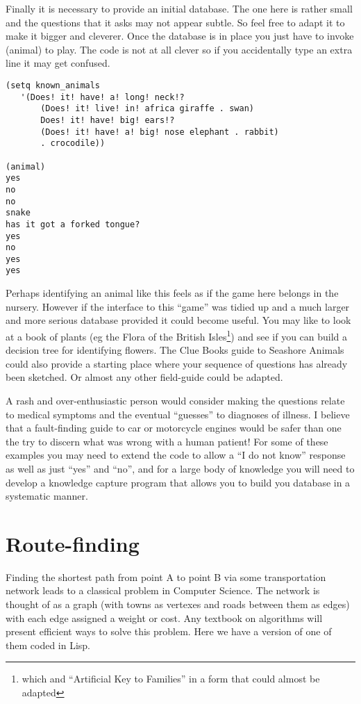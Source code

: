 Finally it is necessary to provide an initial database. The one
here is rather small and the questions that it asks may not appear subtle.
So feel free to adapt it to make it bigger and cleverer. Once the database
is in place you just have to invoke {\tx (animal)} to play. The code is
not at all clever so if you accidentally type an extra line it may get
confused.
{\small\begin{verbatim}
(setq known_animals
   '(Does! it! have! a! long! neck!?
       (Does! it! live! in! africa giraffe . swan)
       Does! it! have! big! ears!?
       (Does! it! have! a! big! nose elephant . rabbit)
       . crocodile))

(animal)
yes
no
no
snake
has it got a forked tongue?
yes
no
yes
yes
\end{verbatim}}

Perhaps identifying an animal like this feels as if the game here
belongs in the nursery. However if the interface to this ``game'' was
tidied up and a much larger and more serious database provided it could
become useful. You may like to look at a book of plants (eg the Flora
of the British Isles\cite{flora}\footnote{which and ``Artificial Key to
Families'' in a form that could almost be adapted}) and see if you can build
a decision tree for identifying flowers. The Clue Books guide to
Seashore Animals\cite{seashore} could also provide a starting place
where your sequence of questions has already been sketched.
Or almost any other field-guide could be adapted.

A rash and over-enthusiastic person
would consider making the questions relate to medical symptoms and the
eventual ``guesses'' to diagnoses of illness. I believe that a fault-finding
guide to car or motorcycle engines would be safer than one the try to
discern what was wrong with a human patient! For some of these examples
you may need to extend the code to allow a ``I do not know'' response as
well as just ``yes'' and ``no'', and for a large body of knowledge you will
need to develop a knowledge capture program that allows you to build
you database in a systematic manner.

\section{Route-finding}
Finding the shortest path from point A to point B via some transportation
network leads to a classical problem in Computer Science. The network
is thought of as a graph (with towns as vertexes and roads between them
as edges) with each edge assigned a weight or cost. Any textbook on algorithms
will present efficient ways to solve this problem. Here we have a
version of one of them coded in Lisp.

